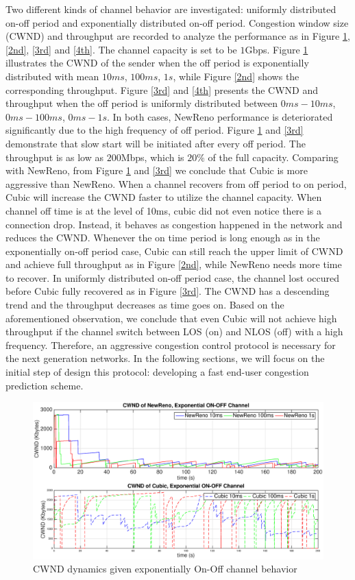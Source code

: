 Two different kinds of channel behavior are investigated: uniformly distributed on-off period and exponentially distributed on-off period. Congestion window size (CWND) and throughput are recorded to analyze the performance as in Figure \ref{1st}, \ref{2nd}, \ref{3rd} and \ref{4th}.  The channel capacity is set to be $1$Gbps. Figure \ref{1st} illustrates the CWND of the sender when the off period is exponentially distributed with mean $10ms$, $100ms$, $1s$, while Figure \ref{2nd} shows the corresponding throughput. Figure \ref{3rd} and \ref{4th} presents the CWND and throughput when the off period is uniformly distributed between $0ms - 10ms$, $0ms - 100ms$, $0ms - 1s$. In both cases, NewReno performance is deteriorated significantly due to the high frequency of off period. Figure \ref{1st} and \ref{3rd} demonstrate that slow start will be initiated after every off period. The throughput is as low as $200$Mbps, which is $20\%$ of the full capacity. Comparing with NewReno, from Figure \ref{1st} and \ref{3rd} we conclude that Cubic is more aggressive than NewReno. When a channel recovers from off period to on period, Cubic will increase the CWND faster to utilize the channel capacity.  When channel off time is at the level of 10ms, cubic did not even notice there is a connection drop. Instead, it behaves as congestion happened in the network and reduces the CWND. Whenever the on time period is long enough as in the exponentially on-off period case, Cubic can still reach the upper limit of CWND and achieve full throughput as in Figure \ref{2nd}, while NewReno needs more time to recover. In uniformly distributed on-off period case, the channel lost occured before Cubic fully recovered as in Figure \ref{3rd}. The CWND has a descending trend and the throughput decreases as time goes on. Based on the aforementioned observation, we conclude that even Cubic will not achieve high throughput if the channel switch between LOS (on) and NLOS (off) with a high frequency. Therefore, an aggressive congestion control protocol is necessary for the next generation networks. In the following sections, we will focus on the initial step of design this protocol: developing a fast end-user congestion prediction scheme.
\begin{figure}
\centering
\includegraphics[width=14cm]{1.eps}
\caption{CWND dynamics given exponentially On-Off channel behavior}
\label{1st}
\end{figure}
